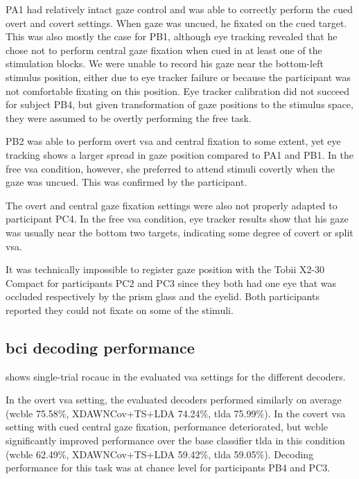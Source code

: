 PA1 had relatively intact gaze control and was able to correctly perform the
cued overt and covert settings.
When gaze was uncued, he fixated on the cued target.
This was also mostly the case for PB1, although eye tracking revealed that he
chose not to perform central gaze fixation when cued in at least one of the
stimulation blocks. We were unable to record his gaze near the bottom-left
stimulus position, either due to eye tracker failure or because the participant
was not comfortable fixating on this position.
Eye tracker calibration did not succeed for subject PB4, but given
transformation of gaze positions to the stimulus space, they were assumed to
be overtly performing the free task.

PB2 was able to perform overt \ac{vsa} and central fixation to some extent,
yet eye tracking shows a larger spread in gaze position compared to
PA1 and PB1.
In the free \ac{vsa} condition, however, she preferred to attend
stimuli covertly when the gaze was uncued.
This was confirmed by the participant.

The overt and central gaze fixation settings were also not properly adapted to
participant PC4.
In the free \ac{vsa} condition, eye tracker results show that his gaze was usually near the
bottom two targets, indicating some degree of covert or split \ac{vsa}.

It was technically impossible to register gaze position with the Tobii X2-30
Compact for participants PC2 and PC3 since they both had one eye that was
occluded respectively by the prism glass and the eyelid.
Both participants reported they could not fixate on some of the
stimuli.

\subsection{\Acs{bci} decoding performance}

 shows single-trial
\ac{rocauc} in the evaluated \ac{vsa} settings for the different decoders.


In the overt \ac{vsa} setting, the evaluated decoders performed similarly on average
(\ac{wcble} 75.58\%, XDAWNCov+TS+LDA 74.24\%, \ac{tlda} 75.99\%).
In the covert \ac{vsa} setting with cued central gaze fixation, performance deteriorated,
but \ac{wcble} significantly improved performance over the base classifier
\ac{tlda} in this condition
(\ac{wcble} 62.49\%, XDAWNCov+TS+LDA 59.42\%, \ac{tlda} 59.05\%).
Decoding performance for this task was at chance level for participants PB4 and
PC3.


